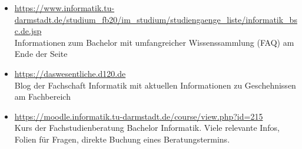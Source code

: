 \begin{itemize}
    \item \url{https://www.informatik.tu-darmstadt.de/studium_fb20/im_studium/studiengaenge_liste/informatik_bsc.de.jsp}\\
        Informationen zum Bachelor mit umfangreicher Wissenssammlung (FAQ) am Ende der Seite
    \item \url{https://daswesentliche.d120.de}\\
        Blog der Fachschaft Informatik mit aktuellen Informationen zu Geschehnissen am Fachbereich
    \item \url{https://moodle.informatik.tu-darmstadt.de/course/view.php?id=215}\\
        Kurs der Fachstudienberatung Bachelor Informatik. Viele relevante Infos, Folien für Fragen, direkte Buchung eines Beratungstermins.
\end{itemize}

\newpage

